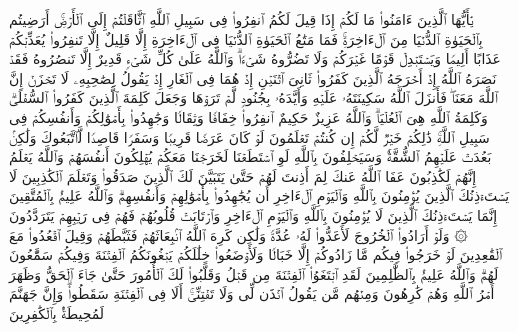 \stopbuffer
\startbuffer[\q:9:38]
یَٰۤأَیُّهَا ٱلَّذِینَ ءَامَنُوا۟ مَا لَكُمۡ إِذَا قِیلَ لَكُمُ ٱنفِرُوا۟ فِی سَبِیلِ ٱللَّهِ ٱثَّاقَلۡتُمۡ إِلَى ٱلۡأَرۡضِۚ أَرَضِیتُم بِٱلۡحَیَوٰةِ ٱلدُّنۡیَا مِنَ ٱلۡءَاخِرَةِۚ فَمَا مَتَٰعُ ٱلۡحَیَوٰةِ ٱلدُّنۡیَا فِی ٱلۡءَاخِرَةِ إِلَّا قَلِیلٌ%
\stopbuffer
\startbuffer[\q:9:39]
إِلَّا تَنفِرُوا۟ یُعَذِّبۡكُمۡ عَذَابًا أَلِیمࣰا وَیَسۡتَبۡدِلۡ قَوۡمًا غَیۡرَكُمۡ وَلَا تَضُرُّوهُ شَیۡءࣰاۗ وَٱللَّهُ عَلَىٰ كُلِّ شَیۡءࣲ قَدِیرٌ%
\stopbuffer
\startbuffer[\q:9:40]
إِلَّا تَنصُرُوهُ فَقَدۡ نَصَرَهُ ٱللَّهُ إِذۡ أَخۡرَجَهُ ٱلَّذِینَ كَفَرُوا۟ ثَانِیَ ٱثۡنَیۡنِ إِذۡ هُمَا فِی ٱلۡغَارِ إِذۡ یَقُولُ لِصَٰحِبِهِۦ لَا تَحۡزَنۡ إِنَّ ٱللَّهَ مَعَنَاۖ فَأَنزَلَ ٱللَّهُ سَكِینَتَهُۥ عَلَیۡهِ وَأَیَّدَهُۥ بِجُنُودࣲ لَّمۡ تَرَوۡهَا وَجَعَلَ كَلِمَةَ ٱلَّذِینَ كَفَرُوا۟ ٱلسُّفۡلَىٰۗ وَكَلِمَةُ ٱللَّهِ هِیَ ٱلۡعُلۡیَاۗ وَٱللَّهُ عَزِیزٌ حَكِیمٌ%
\stopbuffer
\startbuffer[\q:9:41]
ٱنفِرُوا۟ خِفَافࣰا وَثِقَالࣰا وَجَٰهِدُوا۟ بِأَمۡوَٰلِكُمۡ وَأَنفُسِكُمۡ فِی سَبِیلِ ٱللَّهِۚ ذَٰلِكُمۡ خَیۡرࣱ لَّكُمۡ إِن كُنتُمۡ تَعۡلَمُونَ%
\stopbuffer
\startbuffer[\q:9:42]
لَوۡ كَانَ عَرَضࣰا قَرِیبࣰا وَسَفَرࣰا قَاصِدࣰا لَّٱتَّبَعُوكَ وَلَٰكِنۢ بَعُدَتۡ عَلَیۡهِمُ ٱلشُّقَّةُۚ وَسَیَحۡلِفُونَ بِٱللَّهِ لَوِ ٱسۡتَطَعۡنَا لَخَرَجۡنَا مَعَكُمۡ یُهۡلِكُونَ أَنفُسَهُمۡ وَٱللَّهُ یَعۡلَمُ إِنَّهُمۡ لَكَٰذِبُونَ%
\stopbuffer
\startbuffer[\q:9:43]
عَفَا ٱللَّهُ عَنكَ لِمَ أَذِنتَ لَهُمۡ حَتَّىٰ یَتَبَیَّنَ لَكَ ٱلَّذِینَ صَدَقُوا۟ وَتَعۡلَمَ ٱلۡكَٰذِبِینَ%
\stopbuffer
\startbuffer[\q:9:44]
لَا یَسۡتَءۡذِنُكَ ٱلَّذِینَ یُؤۡمِنُونَ بِٱللَّهِ وَٱلۡیَوۡمِ ٱلۡءَاخِرِ أَن یُجَٰهِدُوا۟ بِأَمۡوَٰلِهِمۡ وَأَنفُسِهِمۡۗ وَٱللَّهُ عَلِیمُۢ بِٱلۡمُتَّقِینَ%
\stopbuffer
\startbuffer[\q:9:45]
إِنَّمَا یَسۡتَءۡذِنُكَ ٱلَّذِینَ لَا یُؤۡمِنُونَ بِٱللَّهِ وَٱلۡیَوۡمِ ٱلۡءَاخِرِ وَٱرۡتَابَتۡ قُلُوبُهُمۡ فَهُمۡ فِی رَیۡبِهِمۡ یَتَرَدَّدُونَ%
\stopbuffer
\startbuffer[\q:9:46]
۞ وَلَوۡ أَرَادُوا۟ ٱلۡخُرُوجَ لَأَعَدُّوا۟ لَهُۥ عُدَّةࣰ وَلَٰكِن كَرِهَ ٱللَّهُ ٱنۢبِعَاثَهُمۡ فَثَبَّطَهُمۡ وَقِیلَ ٱقۡعُدُوا۟ مَعَ ٱلۡقَٰعِدِینَ%
\stopbuffer
\startbuffer[\q:9:47]
لَوۡ خَرَجُوا۟ فِیكُم مَّا زَادُوكُمۡ إِلَّا خَبَالࣰا وَلَأَوۡضَعُوا۟ خِلَٰلَكُمۡ یَبۡغُونَكُمُ ٱلۡفِتۡنَةَ وَفِیكُمۡ سَمَّٰعُونَ لَهُمۡۗ وَٱللَّهُ عَلِیمُۢ بِٱلظَّٰلِمِینَ%
\stopbuffer
\startbuffer[\q:9:48]
لَقَدِ ٱبۡتَغَوُا۟ ٱلۡفِتۡنَةَ مِن قَبۡلُ وَقَلَّبُوا۟ لَكَ ٱلۡأُمُورَ حَتَّىٰ جَاۤءَ ٱلۡحَقُّ وَظَهَرَ أَمۡرُ ٱللَّهِ وَهُمۡ كَٰرِهُونَ%
\stopbuffer
\startbuffer[\q:9:49]
وَمِنۡهُم مَّن یَقُولُ ٱئۡذَن لِّی وَلَا تَفۡتِنِّیۤۚ أَلَا فِی ٱلۡفِتۡنَةِ سَقَطُوا۟ۗ وَإِنَّ جَهَنَّمَ لَمُحِیطَةُۢ بِٱلۡكَٰفِرِینَ%
\stopbuffer
\startbuffer[\q:9:50]
